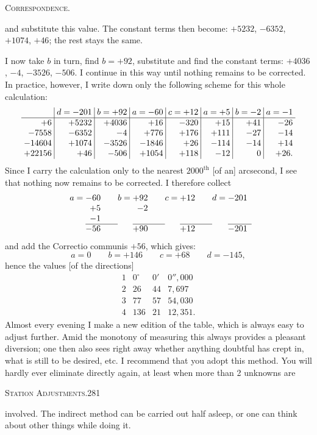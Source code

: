 \clearpage
{}\hfill\textsc{Correspondence.}\hfill\mbox{}\par\medskip
\noindent and substitute this value. The constant terms then become: $+5232$, $-6352$, $+1074$, $+46$; the rest stays the same.

I now take $b$ in turn, find $b=+92$, substitute and find the constant terms: $+4036$, $-4$, $-3526$, $-506$. I continue in this way until nothing remains to be corrected. In practice, however, I write down only the following scheme for this whole calculation:
\[
\setlength{\arraycolsep}{3pt}
\begin{array}{r|r|r|r|r|r|r|r}
&d=-201&b=+92&a=-60&c=+12&a=+5&b=-2&a=-1\\ \hline
+6&+5232&+4036&+16&-320&+15&+41&-26\\
-7558&-6352&-4&+776&+176&+111&-27&-14\\
-14604&+1074&-3526&-1846&+26&-114&-14&+14\\
+22156&+46&-506&+1054&+118&-12&0&+26.
\end{array}
\]
Since I carry the calculation only to the nearest $2000^{\mathrm{th}}$ [of an] arcsecond, I see that nothing now remains to be corrected. I therefore collect
\[
\begin{array}{r@{\;}c@{\;}r@{\qquad}r@{\;}c@{\;}r@{\qquad}r@{\;}c@{\;}r@{\qquad}r@{\;}c@{\;}r}
a&=&-60&b&=&+92&c&=&+12&d&=&-201\\
&&+5&&&-2&&&&&&\\
&&-1&&&&&&&&&\\ \cline{3-3}\cline{6-6}\cline{9-9}\cline{12-12}
&&-56&&&+90&&&+12&&&-201
\end{array}
\]
and add the Correctio communis $+56$, which gives:
\[
a=0\qquad b=+146\qquad c=+68\qquad d=-145,
\]
hence the values [of the directions]
\[
\begin{array}{r|rrr}
1&0^\circ&0'&0''{,}000\\
2&26&44&7{,}697\\
3&77&57&54{,}030\\
4&136&21&12{,}351.
\end{array}
\]
Almost every evening I make a new edition of the table, which is always easy to adjust further. Amid the monotony of measuring this always provides a pleasant diversion; one then also sees right away whether anything doubtful has crept in, what is still to be desired, etc. I recommend that you adopt this method. You will hardly ever eliminate directly again, at least when more than 2 unknowns are

\clearpage
\noindent\mbox{}\hfill\textsc{Station Adjustments.}\hfill281\par\medskip
\noindent involved. The indirect method can be carried out half asleep, or one can think about other things while doing it.

